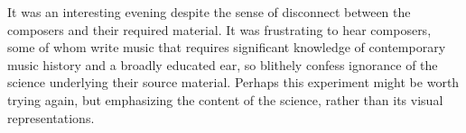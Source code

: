 It was an interesting evening despite the sense of disconnect between the composers and their required material. It was frustrating to hear composers, some of whom write music that requires significant knowledge of contemporary music history and a broadly educated ear, so blithely confess ignorance of the science underlying their source material. Perhaps this experiment might be worth trying again, but emphasizing the content of the science, rather than its visual representations.
